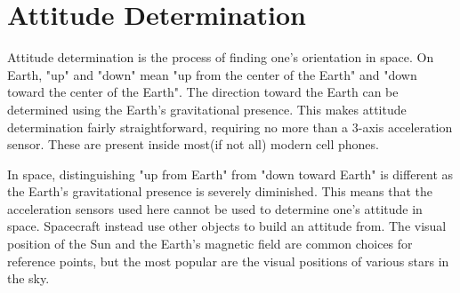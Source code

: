 \section{Attitude Determination}\label{sec:attitudeDetermination}
Attitude determination is the process of finding one's orientation in space.
On Earth, "up" and "down" mean "up from the center of the Earth" and "down toward the center of the Earth".
The direction toward the Earth can be determined using the Earth's gravitational presence.
This makes attitude determination fairly straightforward, requiring no more than a 3-axis acceleration sensor.
These are present inside most(if not all) modern cell phones.

In space, distinguishing "up from Earth" from "down toward Earth" is different as the Earth's gravitational presence is
severely diminished.
This means that the acceleration sensors used here cannot be used to determine one's attitude in
space.
Spacecraft instead use other objects to build an attitude from.
The visual position of the Sun and the Earth's magnetic field are common choices for reference points, but the most
popular are the visual positions of various stars in the sky.

\begin{figure}
\end{figure}

